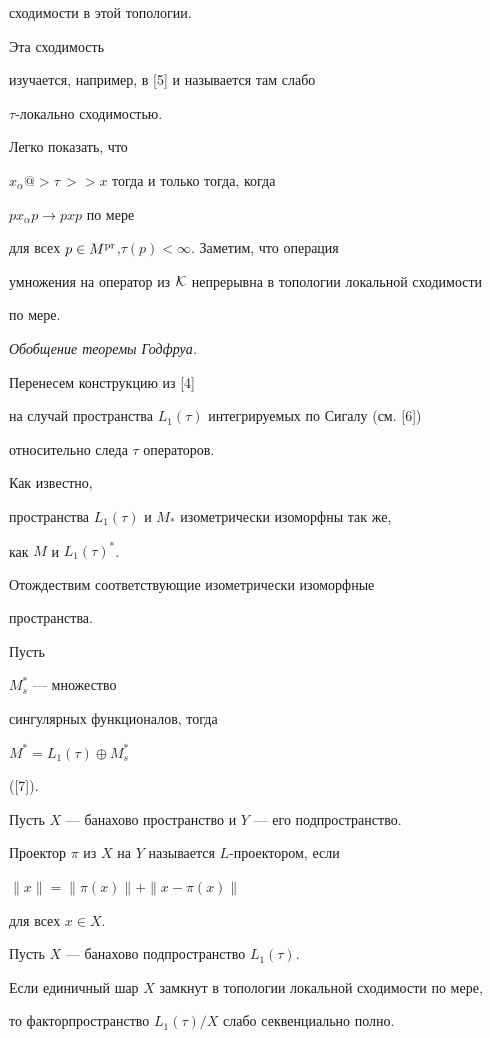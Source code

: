 сходимости в этой топологии.


Эта сходимость


изучается, например, в [5] и называется там слабо


$\tau$-локально сходимостью.


Легко показать, что


$x_{\alpha}@>{\tau\,}>> x$ тогда и только тогда, когда


$px_{\alpha}p\to pxp $ по мере


для всех $p\in M^{\operatorname{pr}}$,\linebreak $\tau(p)<\infty$. Заметим, что операция


умножения на оператор из $\cal K$ непрерывна в топологии локальной сходимости


по мере.


\medskip





{\it Обобщение теоремы Годфруа.}


Перенесем конструкцию из [4]


на случай пространства $L_{1}({\tau})$ интегрируемых по Сигалу (см. [6])


относительно следа ${\tau}$ операторов.


Как известно,


пространства $L_{1}(\tau)$ и $M_{*}$ изометрически изоморфны так же,


как $M$ и $L_{1}(\tau)^{*}$.


Отождествим соответствующие изометрически изоморфные


пространства.


Пусть


$M_{s}^{*}$ --- множество


сингулярных функционалов, тогда


$M^{*}=L_{1}({\tau})\oplus M_{s}^{*}$


([7]).





Пусть $X$ --- банахово пространство и $Y$ --- его подпространство.


Проектор $\pi$ из $X$ на $Y$ называется $L$-проектором, если


$\| x \|=\| \pi(x) \| + \| x-\pi(x)\|$


для всех $x\in X$.





\begin{thm}


Пусть $X$ --- банахово подпространство $L_{1}({\tau})$.


Если единичный шар $X$ замкнут в топологии локальной сходимости по мере,


то факторпространство $L_{1}({\tau})/X$ слабо секвенциально полно.


\end{thm}





